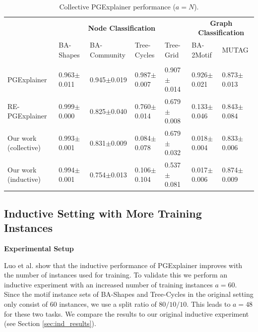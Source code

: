 \begin{table}[ht]
    \centering
    \scriptsize
    \begin{tabularx}{\textwidth}{l|XXXX|XX}   %
    \multicolumn{1}{c}{\textbf{}} & \multicolumn{4}{c}{\textbf{Node Classification}} & \multicolumn{2}{c}{\textbf{Graph Classification}} \\
    \textbf{} & BA-Shapes & BA-Community & Tree-Cycles & Tree-Grid & BA-2Motif & MUTAG \\
    \midrule
    \addlinespace
    \multicolumn{7}{c}{\textbf{Explanation AUROC}} \\
    \midrule
    PGExplainer & 0.963$\pm$0.011 & 0.945$\pm$0.019 & 0.987$\pm$0.007 & 0.907$\pm$0.014 & 0.926$\pm$0.021 & 0.873$\pm$0.013 \\
    RE-PGExplainer & 0.999$\pm$0.000 & 0.825$\pm$0.040 & 0.760$\pm$0.014 & 0.679$\pm$0.008 & 0.133$\pm$0.046 & 0.843$\pm$0.084 \\
    Our work (collective) & 0.993$\pm$0.001 & 0.831$\pm$0.009 & 0.084$\pm$0.078 & 0.679$\pm$0.032 & 0.018$\pm$0.004 & 0.833$\pm$0.006 \\
    \hline
    Our work (inductive) & 0.994$\pm$0.001 & 0.754$\pm$0.013 & 0.106$\pm$0.104 & 0.537$\pm$0.081 & 0.017$\pm$0.006 & 0.874$\pm$0.009 \\
    \end{tabularx}
    \caption[Collective performance of our reimplementation]{Collective PGExplainer performance ($a=N$).}
    \label{tab:pgexplainer_auc_collective}
\end{table}


\subsection{Inductive Setting with More Training Instances}
\label{sec:exp_more_train}

\textbf{Experimental Setup}\par
Luo et al. \cite{luo2020parameterized} show that the inductive performance of PGExplainer improves with the number of instances used for training. To validate this we perform an inductive experiment with an increased number of training instances $a=60$. Since the motif instance sets of BA-Shapes and Tree-Cycles in the original setting only consist of 60 instances, we use a split ratio of $80/10/10$. This leads to $a=48$ for these two tasks. We compare the results to our original inductive experiment (see Section \ref{sec:ind_results}). \bigskip

